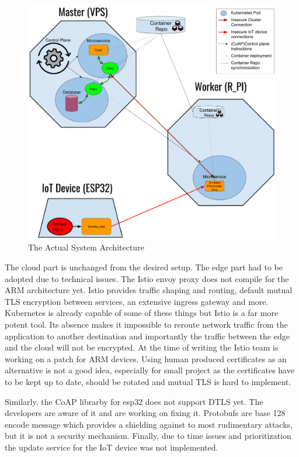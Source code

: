 \begin{figure}[!ht]
    \centering
    \includegraphics[width=\textwidth]{figures/actualImplementationSetup.png}
    \caption{The Actual System Architecture}
    \label{fig:actualImplementationSetup}
\end{figure}

The cloud part is unchanged from the desired setup. The edge part had to be adopted due to technical issues. The Istio envoy proxy does not compile for the ARM architecture yet. Istio provides traffic shaping and routing, default mutual TLS encryption between services, an extensive ingress gateway and more. Kubernetes is already capable of some of these things but Istio is a far more potent tool. Its absence makes it impossible to reroute network traffic from the application to another destination and importantly the traffic between the edge and the cloud will not be encrypted. At the time of writing the Istio team is working on a patch for ARM devices. Using human produced certificates as an alternative is not a good idea, especially for small project as the certificates have to be kept up to date, should be rotated and mutual TLS is hard to implement.

Similarly, the CoAP librarby for esp32 does not support DTLS yet. The developers are aware of it and are working on fixing it. Protobufs are base 128 encode message which provides a shielding against to most rudimentary attacks, but it is not a security mechanism. Finally, due to time issues and prioritization the update service for the IoT device was not implemented.

